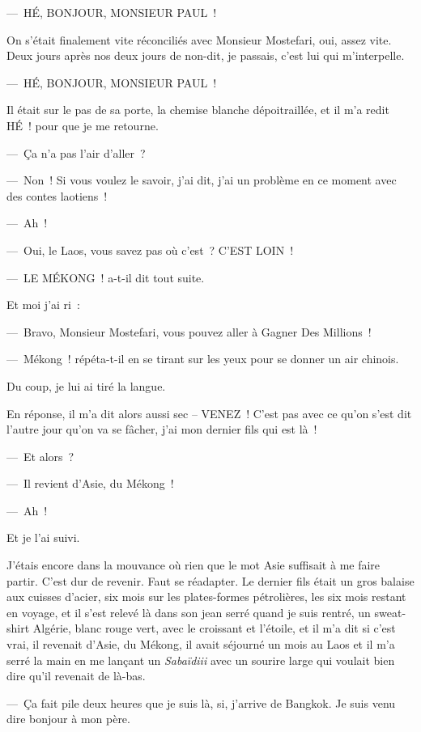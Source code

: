 \documentclass[french,twoside]{book} %
\begin{document}
— HÉ, BONJOUR, MONSIEUR PAUL !\par
On s’était finalement vite réconciliés avec Monsieur Mostefari, oui, assez vite. Deux jours après nos deux jours de non-dit, je passais, c’est lui qui m’interpelle.\par
— HÉ, BONJOUR, MONSIEUR PAUL !\par
Il était sur le pas de sa porte, la chemise blanche dépoitraillée, et il m’a redit HÉ ! pour que je me retourne.\par
— Ça n’a pas l’air d’aller ?\par
— Non ! Si vous voulez le savoir, j’ai dit, j’ai un problème en ce moment avec des contes laotiens !\par
— Ah !\par
— Oui, le Laos, vous savez pas où c’est ? C’EST LOIN !\par
— LE MÉKONG ! a-t-il dit tout suite.\par
Et moi j’ai ri :\par
— Bravo, Monsieur Mostefari, vous pouvez aller à Gagner Des Millions !\par
— Mékong ! répéta-t-il en se tirant sur les yeux pour se donner un air chinois.\par
Du coup, je lui ai tiré la langue.\par
En réponse, il m’a dit alors aussi sec – VENEZ ! C’est pas avec ce qu’on s’est dit l’autre jour qu’on va se fâcher, j’ai mon dernier fils qui est là !\par
— Et alors ?\par
— Il revient d’Asie, du Mékong !\par
— Ah !\par
Et je l’ai suivi.\par
J’étais encore dans la mouvance où rien que le mot Asie suffisait à me faire partir. C’est dur de revenir. Faut se réadapter. Le dernier fils était un gros balaise aux cuisses d’acier, six mois sur les plates-formes pétrolières, les six mois restant en voyage, et il s’est relevé là dans son jean serré quand je suis rentré, un sweat-shirt Algérie, blanc rouge vert, avec le croissant et l’étoile, et il m’a dit si c’est vrai, il revenait d’Asie, du Mékong, il avait séjourné un mois au Laos et il m’a serré la main en me lançant un \emph{Sabaïdiii} avec un sourire large qui voulait bien dire qu’il revenait de là-bas.\par
— Ça fait pile deux heures que je suis là, si, j’arrive de Bangkok. Je suis venu dire bonjour à mon père.\par
\end{document}
